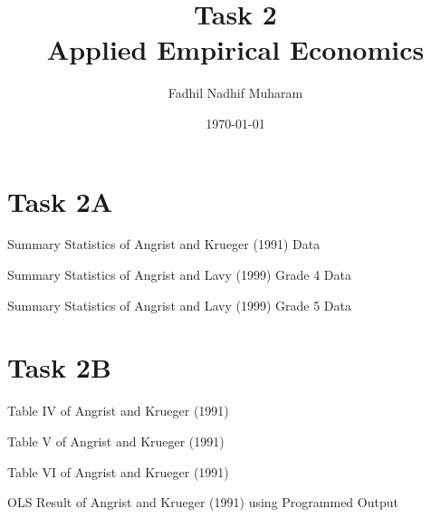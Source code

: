 \documentclass[10pt,leqno]{article}
\title{Task 2 \\
Applied Empirical Economics}
\author{Fadhil Nadhif Muharam}
\date{\today}
\begin{document}
\maketitle

\section*{Task 2A}

\begin{table}[h!]
    \centering
    \caption{Summary Statistics of Angrist and Krueger (1991) Data}
    
\end{table}

\begin{table}[h!]
    \centering
    \caption{Summary Statistics of Angrist and Lavy (1999) Grade 4 Data}
    
\end{table}

\begin{table}[h!]
    \centering
    \caption{Summary Statistics of Angrist and Lavy (1999) Grade 5 Data}
    
\end{table}

\pagebreak
\pagebreak

\section*{Task 2B}

\begin{table}[h!]
    \centering
    \caption{Table IV of Angrist and Krueger (1991)}
    \resizebox{1\textwidth}{!}{
    
    }%
\end{table}

\begin{table}[h!]
    \centering
    \caption{Table V of Angrist and Krueger (1991)}
    \resizebox{1\textwidth}{!}{
    
    }%
\end{table}

\begin{table}[h!]
    \centering
    \caption{Table VI of Angrist and Krueger (1991)}
     \resizebox{1\textwidth}{!}{
    
    }%
\end{table}

\begin{table}[h!]
    \centering
    \caption{OLS Result of Angrist and Krueger (1991) using Programmed Output}
    
\end{table}
\end{document}

